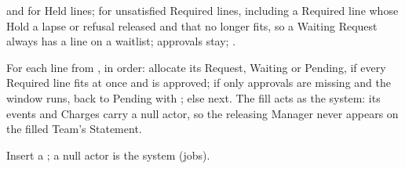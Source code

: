 \begin{description}[leftmargin=0pt,font=\normalfont\ttfamily]
\item[toWaiting]  and  for Held lines;  for unsatisfied Required lines, including a Required line whose Hold a lapse or refusal released and that no longer fits, so a Waiting Request always has a line on a waitlist; approvals stay; .
\item[onCapacityFreed] For each line from , in order: allocate its Request, Waiting or Pending, if every Required line fits at once and is approved; if only approvals are missing and the window runs, back to Pending with ; else next. The fill acts as the system: its events and Charges carry a null actor, so the releasing Manager never appears on the filled Team's Statement.
\item[record] Insert a ; a null actor is the system (jobs).
\end{description}

